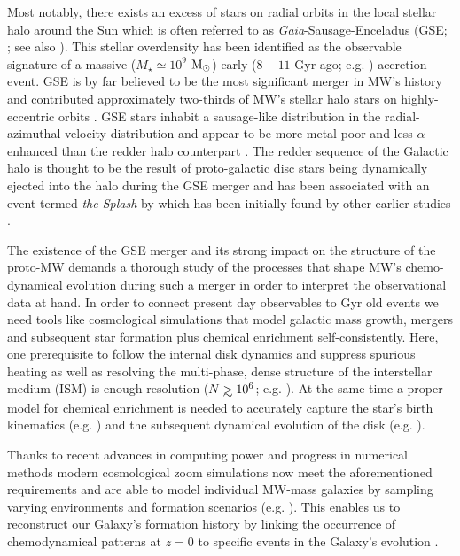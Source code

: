 \documentclass[useAMS,usenatbib]{mnras}
\def\gtrsim{\mathrel{\hbox{\rlap{\hbox{\lower4pt\hbox{$\sim$}}}\hbox{$>$}}}}
\begin{document}
Most notably, there exists an excess of stars on radial orbits in the local stellar halo around the Sun which is often referred to as {\it Gaia}-Sausage-Enceladus (GSE; \citealt{Belokurov2018, Helmi2018}; see also \citealt{Nissen2010, Koppelman2018, Haywood2018}). This stellar overdensity has been identified as the observable signature of a massive ($M_{\star} \simeq 10^{9}$ $\rm{M_{\odot}}$) early ($8-11$ Gyr ago; e.g. \citealt{Vincenzo2019, Belokurov2020, Naidu2021, Xiang2022}) accretion event. GSE is by far believed to be the most significant merger in MW's history and contributed approximately two-thirds of MW's stellar halo stars on highly-eccentric orbits \citep[e.g.][]{Mackereth2020}. GSE stars inhabit a sausage-like distribution in the radial-azimuthal velocity distribution \citep{Brook2003, Belokurov2018} and appear to be more metal-poor and less $\alpha$-enhanced than the redder halo counterpart \citep{Haywood2018, Helmi2018}. The redder sequence of the Galactic halo is thought to be the result of proto-galactic disc stars being dynamically ejected into the halo during the GSE merger and has been associated with an event termed {\it the Splash} by \cite{Belokurov2020, Bonaca2020} which has been initially found by other earlier studies \citep{Bonaca2017, Haywood2018, DiMatteo2019, Gallart2019}. 

The existence of the GSE merger and its strong impact on the structure of the proto-MW demands a thorough study of the processes that shape MW's chemo-dynamical evolution during such a merger in order to interpret the observational data at hand. In order to connect present day observables to Gyr old events we need tools like cosmological simulations that model galactic mass growth, mergers and subsequent star formation plus chemical enrichment self-consistently. Here, one prerequisite to follow the internal disk dynamics and suppress spurious heating as well as resolving the multi-phase, dense structure of the interstellar medium (ISM) is enough resolution ($N \gtrsim 10^6$; e.g. \citealt{Sellwood2013,Ludlow2019,Ludlow2021}). At the same time a proper model for chemical enrichment \citep[e.g.][]{Buck2021} is needed to accurately capture the star's birth kinematics (e.g. \citealt{Ratcliffe2022, Lu2022}) and the subsequent dynamical evolution of the disk (e.g. \citealt{House2011, Bird2013, Buck2019b}).

Thanks to recent advances in computing power and progress in numerical methods modern cosmological zoom simulations now meet the aforementioned requirements and are able to model individual MW-mass galaxies by sampling varying environments and formation scenarios (e.g. \citealt{Sawala2016, Grand2017, Buck2018, Font2020, Applebaum2021, Agertz2021, Bird2021, Khoperskov2022-InSitu}). This enables us to reconstruct our Galaxy's formation history by linking the occurrence of chemodynamical patterns at $z=0$ to specific events in the Galaxy's evolution \citep[e.g.][]{Bignone2019, Fattahi2019, Grand2020, Elias2020, Dillamore2022, Khoperskov2022a, Rey2022}.
\end{document}
